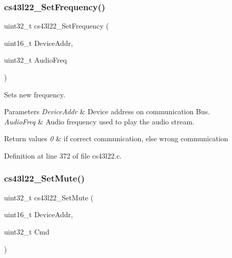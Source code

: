 \subsubsection{\texorpdfstring{cs43l22\+\_\+\+Set\+Frequency()}{cs43l22\_SetFrequency()}}
{\footnotesize\ttfamily uint32\+\_\+t cs43l22\+\_\+\+Set\+Frequency (\begin{DoxyParamCaption}\item[{uint16\+\_\+t}]{Device\+Addr,  }\item[{uint32\+\_\+t}]{Audio\+Freq }\end{DoxyParamCaption})}



Sets new frequency. 


\begin{DoxyParams}{Parameters}
{\em Device\+Addr} & Device address on communication Bus. ~\newline
\\
\hline
{\em Audio\+Freq} & Audio frequency used to play the audio stream. \\
\hline
\end{DoxyParams}

\begin{DoxyRetVals}{Return values}
{\em 0} & if correct communication, else wrong communication \\
\hline
\end{DoxyRetVals}


Definition at line 372 of file cs43l22.\+c.

\mbox{\label{group___c_s43_l22___exported___functions_gaed17c2b64d79830afa43b5a45b159286}} 
\subsubsection{\texorpdfstring{cs43l22\+\_\+\+Set\+Mute()}{cs43l22\_SetMute()}}
{\footnotesize\ttfamily uint32\+\_\+t cs43l22\+\_\+\+Set\+Mute (\begin{DoxyParamCaption}\item[{uint16\+\_\+t}]{Device\+Addr,  }\item[{uint32\+\_\+t}]{Cmd }\end{DoxyParamCaption})}



